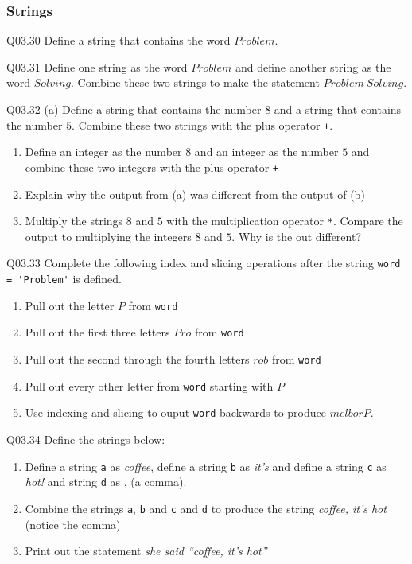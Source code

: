 \documentclass{book}
\begin{document}
    
        \subsubsection{Strings}\label{strings}

Q03.30 Define a string that contains the word \(Problem\).

Q03.31 Define one string as the word \(Problem\) and define another
string as the word \(Solving\). Combine these two strings to make the
statement \(Problem \ Solving\).

Q03.32 (a) Define a string that contains the number \(8\) and a string
that contains the number \(5\). Combine these two strings with the plus
operator \lstinline!+!.

\begin{enumerate}
\def\labelenumi{(\alph{enumi})}
\setcounter{enumi}{1}
\item
  Define an integer as the number \(8\) and an integer as the number
  \(5\) and combine these two integers with the plus operator
  \lstinline!+!
\item
  Explain why the output from (a) was different from the output of (b)
\item
  Multiply the strings \(8\) and \(5\) with the multiplication operator
  \lstinline!*!. Compare the output to multiplying the integers \(8\)
  and \(5\). Why is the out different?
\end{enumerate}

Q03.33 Complete the following index and slicing operations after the
string \lstinline!word = 'Problem'! is defined.

\begin{enumerate}
\def\labelenumi{(\alph{enumi})}
\item
  Pull out the letter \(P\) from \lstinline!word!
\item
  Pull out the first three letters \(Pro\) from \lstinline!word!
\item
  Pull out the second through the fourth letters \(rob\) from
  \lstinline!word!
\item
  Pull out every other letter from \lstinline!word! starting with \(P\)
\item
  Use indexing and slicing to ouput \lstinline!word! backwards to
  produce \(melborP\).
\end{enumerate}

Q03.34 Define the strings below:

\begin{enumerate}
\def\labelenumi{(\alph{enumi})}
\item
  Define a string \lstinline!a! as \emph{coffee}, define a string
  \lstinline!b! as \emph{it's} and define a string \lstinline!c! as
  \emph{hot!} and string \lstinline!d! as , (a comma).
\item
  Combine the strings \lstinline!a!, \lstinline!b! and \lstinline!c! and
  \lstinline!d! to produce the string \emph{coffee, it's hot} (notice
  the comma)
\item
  Print out the statement \emph{she said ``coffee, it's hot''}
\end{enumerate}
\end{document}
